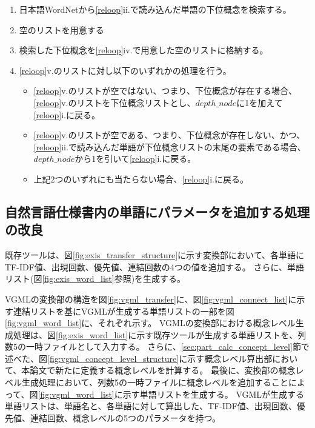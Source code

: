 \begin{enumerate}
\begin{enumerate}
\begin{enumerate}
                    \item 日本語WordNetから\ref{reloop}ii.で読み込んだ単語の下位概念を検索する。
                    \item 空のリストを用意する
                    \label{sec:lower_concept_list2}
                    \item 検索した下位概念を\ref{reloop}iv.で用意した空のリストに格納する。
                    \label{sec:update_lower_concept_list}
                    \item \ref{reloop}v.のリストに対し以下のいずれかの処理を行う。
                    \begin{itemize}
                        \item \ref{reloop}v.のリストが空ではない、つまり、下位概念が存在する場合、\ref{reloop}v.のリストを下位概念リストとし、$depth\_node$に1を加えて\ref{reloop}i.に戻る。
                        \item \ref{reloop}v.のリストが空である、つまり、下位概念が存在しない、かつ、\ref{reloop}ii.で読み込んだ単語が下位概念リストの末尾の要素である場合、$depth\_node$から1を引いて\ref{reloop}i.に戻る。
                        \item 上記2つのいずれにも当たらない場合、\ref{reloop}i.に戻る。
                    \end{itemize}
                \end{enumerate}
        \end{enumerate}
\end{enumerate}

\subsection{自然言語仕様書内の単語にパラメータを追加する処理の改良}
\label{sec:improve_word_list}
既存ツールは、図\ref{fig:exis_transfer_structure}に示す変換部において、各単語にTF-IDF値、出現回数、優先値、連結回数の4つの値を追加する。
さらに、単語リスト(図\ref{fig:exis_word_list}参照)を生成する。

VGMLの変換部の構造を図\ref{fig:vgml_transfer}に、図\ref{fig:vgml_connect_list}に示す連結リストを基にVGMLが生成する単語リストの一部を図\ref{fig:vgml_word_list}に、それぞれ示す。
VGMLの変換部における概念レベル生成処理は、図\ref{fig:exis_word_list}に示す既存ツールが生成する単語リストを、列数5の一時ファイルとして入力する。
さらに、\ref{sec:part_calc_concept_level}節で述べた、図\ref{fig:vgml_concept_level_structure}に示す概念レベル算出部において、本論文で新たに定義する概念レベルを計算する。
最後に、変換部の概念レベル生成処理において、列数5の一時ファイルに概念レベルを追加することによって、図\ref{fig:vgml_word_list}に示す単語リストを生成する。
VGMLが生成する単語リストは、単語名と、各単語に対して算出した、TF-IDF値、出現回数、優先値、連結回数、概念レベルの5つのパラメータを持つ。

